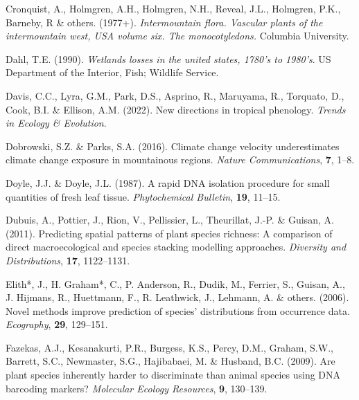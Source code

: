 \documentclass[
]{article}
\newlength{\cslhangindent}
\newlength{\cslentryspacingunit} %
\newenvironment{CSLReferences}[2] %
 {%
  \setlength{\parindent}{0pt}
  \ifodd #1
  \let\oldpar\par
  \def\par{\hangindent=\cslhangindent\oldpar}
  \fi
  \setlength{\parskip}{#2\cslentryspacingunit}
 }%
 {}
\begin{document}
\begin{CSLReferences}{1}{0}
\leavevmode{}%
Cronquist, A., Holmgren, A.H., Holmgren, N.H., Reveal, J.L., Holmgren,
P.K., Barneby, R \& others. (1977+). \emph{Intermountain flora. Vascular
plants of the intermountain west, USA volume six. The monocotyledons.}
Columbia University.

\leavevmode{}%
Dahl, T.E. (1990). \emph{Wetlands losses in the united states, 1780's to
1980's}. US Department of the Interior, Fish; Wildlife Service.

\leavevmode{}%
Davis, C.C., Lyra, G.M., Park, D.S., Asprino, R., Maruyama, R.,
Torquato, D., Cook, B.I. \& Ellison, A.M. (2022). New directions in
tropical phenology. \emph{Trends in Ecology \& Evolution}.

\leavevmode{}%
Dobrowski, S.Z. \& Parks, S.A. (2016). Climate change velocity
underestimates climate change exposure in mountainous regions.
\emph{Nature Communications}, \textbf{7}, 1--8.

\leavevmode{}%
Doyle, J.J. \& Doyle, J.L. (1987). A rapid DNA isolation procedure for
small quantities of fresh leaf tissue. \emph{Phytochemical Bulletin},
\textbf{19}, 11--15.

\leavevmode{}%
Dubuis, A., Pottier, J., Rion, V., Pellissier, L., Theurillat, J.-P. \&
Guisan, A. (2011). Predicting spatial patterns of plant species
richness: A comparison of direct macroecological and species stacking
modelling approaches. \emph{Diversity and Distributions}, \textbf{17},
1122--1131.

\leavevmode{}%
Elith*, J., H. Graham*, C., P. Anderson, R., Dudik, M., Ferrier, S.,
Guisan, A., J. Hijmans, R., Huettmann, F., R. Leathwick, J., Lehmann, A.
\& others. (2006). Novel methods improve prediction of species'
distributions from occurrence data. \emph{Ecography}, \textbf{29},
129--151.

\leavevmode{}%
Fazekas, A.J., Kesanakurti, P.R., Burgess, K.S., Percy, D.M., Graham,
S.W., Barrett, S.C., Newmaster, S.G., Hajibabaei, M. \& Husband, B.C.
(2009). Are plant species inherently harder to discriminate than animal
species using DNA barcoding markers? \emph{Molecular Ecology Resources},
\textbf{9}, 130--139.


\end{CSLReferences}
\end{document}
